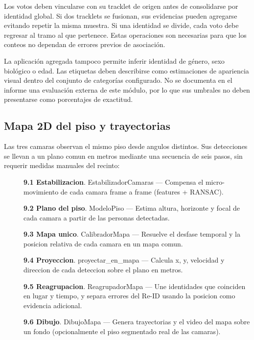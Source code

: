 \documentclass[12pt,letterpaper]{article}
\begin{document}
Los votos deben vincularse con su tracklet de origen antes de consolidarse por identidad global. Si dos tracklets se fusionan, sus evidencias pueden agregarse evitando repetir la misma muestra. Si una identidad se divide, cada voto debe regresar al tramo al que pertenece. Estas operaciones son necesarias para que los conteos no dependan de errores previos de asociación.

La aplicación agregada tampoco permite inferir identidad de género, sexo biológico o edad. Las etiquetas deben describirse como estimaciones de apariencia visual dentro del conjunto de categorías configurado. No se documenta en el informe una evaluación externa de este módulo, por lo que sus umbrales no deben presentarse como porcentajes de exactitud.


\subsection{Mapa 2D del piso y trayectorias}

Las tres camaras observan el mismo piso desde angulos distintos. Sus detecciones se llevan a un plano comun en metros mediante una secuencia de seis pasos, sin requerir medidas manuales del recinto:


\begin{description}

\item[] \textbf{9.1 Estabilizacion}. EstabilizadorCamaras — Compensa el micro-movimiento de cada camara frame a frame (features + RANSAC).

\item[] \textbf{9.2 Plano del piso}. ModeloPiso — Estima altura, horizonte y focal de cada camara a partir de las personas detectadas.

\item[] \textbf{9.3 Mapa unico}. CalibradorMapa — Resuelve el desfase temporal y la posicion relativa de cada camara en un mapa comun.

\item[] \textbf{9.4 Proyeccion}. proyectar\_en\_mapa — Calcula x, y, velocidad y direccion de cada deteccion sobre el plano en metros.

\item[] \textbf{9.5 Reagrupacion}. ReagrupadorMapa — Une identidades que coinciden en lugar y tiempo, y separa errores del Re-ID usando la posicion como evidencia adicional.

\item[] \textbf{9.6 Dibujo}. DibujoMapa — Genera trayectorias y el video del mapa sobre un fondo (opcionalmente el piso segmentado real de las camaras).

\end{description}
\end{document}
